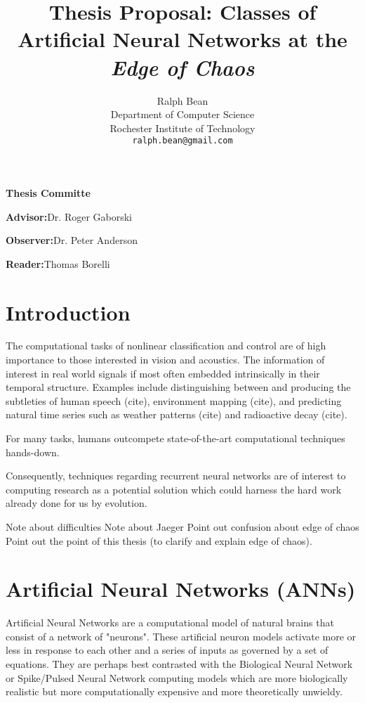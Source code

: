 \documentclass[12pt]{article}
\title{Thesis Proposal:  Classes of Artificial Neural Networks at the \textit{Edge of Chaos}}
\author{Ralph Bean\\
Department of Computer Science\\
Rochester Institute of Technology\\
\texttt{ralph.bean@gmail.com}}
\begin{document}
\maketitle
\vfill
\textbf{Thesis Committe}

\textbf{Advisor:}\hspace{14pt}Dr. Roger Gaborski

\textbf{Observer:}\hspace{7pt}Dr. Peter Anderson

\textbf{Reader:}\hspace{18pt}Thomas Borelli


\newpage
\setcounter{secnumdepth}{3}

\tableofcontents
\newpage

\section{Introduction}
The computational tasks of nonlinear classification and control are of high
importance to those interested in vision and acoustics.  The information
of interest in real world signals if most often embedded intrinsically in
their temporal structure.  Examples include distinguishing between and
producing the subtleties of human speech (cite), environment mapping (cite),
and predicting natural time series such as weather patterns (cite) and 
radioactive decay (cite).

For many tasks, humans outcompete state-of-the-art computational techniques
hands-down.

Consequently, techniques regarding recurrent neural networks 
are of interest to computing research as a potential solution which could
harness the hard work already done for us by evolution.  

Note about difficulties
Note about Jaeger
Point out confusion about edge of chaos
Point out the point of this thesis (to clarify and explain edge of chaos).


\section{Artificial Neural Networks (ANNs)}
Artificial Neural Networks are a computational model of natural brains that
consist of a network of "neurons".  These artificial neuron models activate 
more or less in response to
each other and a series of inputs as governed by a set of equations.  
They are perhaps best contrasted with
the Biological Neural Network or Spike/Pulsed Neural Network computing models
which are more biologically realistic but more computationally expensive and
more theoretically unwieldy.
\end{document}
